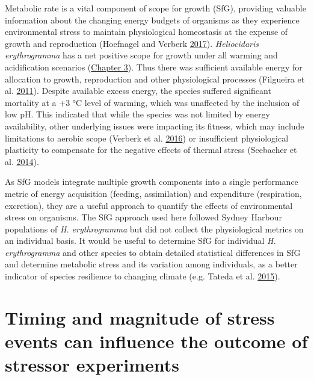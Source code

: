 \documentclass[a4paper,10pt, oneside]{memoir}
\begin{document}
Metabolic rate is a vital component of scope for growth (SfG), providing valuable information about the changing energy budgets of organisms as they experience environmental stress to maintain physiological homeostasis at the expense of growth and reproduction (Hoefnagel and Verberk \protect\hyperlink{ref-Hoefnagel2017}{2017}).
\emph{Heliocidaris erythrogramma} has a net positive scope for growth under all warming and acidification scenarios (\protect\hyperlink{multistressor}{Chapter 3}).
Thus there was sufficient available energy for allocation to growth, reproduction and other physiological processes (Filgueira et al. \protect\hyperlink{ref-Filgueira2011}{2011}).
Despite available excess energy, the species suffered significant mortality at a +3 °C level of warming, which was unaffected by the inclusion of low pH.
This indicated that while the species was not limited by energy availability, other underlying issues were impacting its fitness, which may include limitations to aerobic scope (Verberk et al. \protect\hyperlink{ref-Verberk2016}{2016}) or insufficient physiological plasticity to compensate for the negative effects of thermal stress (Seebacher et al. \protect\hyperlink{ref-Seebacher2014}{2014}).

As SfG models integrate multiple growth components into a single performance metric of energy acquisition (feeding, assimilation) and expenditure (respiration, excretion), they are a useful approach to quantify the effects of environmental stress on organisms.
The SfG approach used here followed Sydney Harbour populations of \emph{H. erythrogramma} but did not collect the physiological metrics on an individual basis.
It would be useful to determine SfG for individual \emph{H. erythrogramma} and other species to obtain detailed statistical differences in SfG and determine metabolic stress and its variation among individuals, as a better indicator of species resilience to changing climate (e.g. Tateda et al. \protect\hyperlink{ref-Tateda2015}{2015}).

\hypertarget{timing-and-magnitude-of-stress-events-can-influence-the-outcome-of-stressor-experiments}{%
\section{Timing and magnitude of stress events can influence the outcome of stressor experiments}\label{timing-and-magnitude-of-stress-events-can-influence-the-outcome-of-stressor-experiments}}
\end{document}
